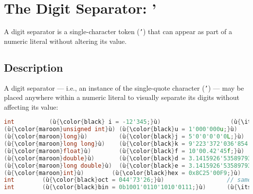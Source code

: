 \newpage
\section[Digit Separators]{The Digit Separator: {\SecCode '}}
\label{digitseparator} %
\label{digit-separators} %


A digit separator is a single-character token (\texttt{'}) that can appear as part of a
numeric literal without altering its value.

\subsection[Description]{Description}\label{description}

A digit separator --- i.e., an instance of the single-quote
character (\texttt{'}) --- may be placed anywhere within a numeric
literal to visually separate its digits without affecting its value:


\begin{lstlisting}[language=C++]
int          (ù{\color{black} i = -12'345;}ù)                    (ù{\itshape\color{skyblue}// same as}ù) (ù{\codeincomments{-12345}}ù)
(ù{\color{maroon}unsigned int}ù) (ù{\color{black}u = 1'000'000u;}ù)                 (ù{\itshape\color{skyblue}// same as}ù) (ù{\codeincomments{1000000u}}ù)
(ù{\color{maroon}long}ù)         (ù{\color{black}j = 5'0'0'0'0'0L;}ù)               // same as (ù{\codeincomments{500000L}}ù)
(ù{\color{maroon}long long}ù)    (ù{\color{black}k = 9'223'372'036'854'775'807;}ù)  // same as (ù{\codeincomments{9223372036854775807}}ù)
(ù{\color{maroon}float}ù)        (ù{\color{black}f = 10'00.42'45f;}ù)               // same as (ù{\codeincomments{1000.4245f}}ù)
(ù{\color{maroon}double}ù)       (ù{\color{black}d = 3.1415926'53589793;}ù)         (ù{\itshape\color{skyblue}// same as}ù) (ù{\codeincomments{3.141592653589793}}ù)
(ù{\color{maroon}long double}ù)  (ù{\color{black}e = 3.1415926'53589793'23846;}ù)   (ù{\itshape\color{skyblue}// same as}ù) (ù{\codeincomments{3.14159265358979323846}}ù)
(ù{\color{maroon}int}ù)        (ù{\color{black}hex = 0x8C25'00F9;}ù)                // same as (ù{\codeincomments{0x8C2500F9}}ù)
int        (ù{\color{black}oct = 044'73'26;}ù)                  // same as (ù{\codeincomments{0447326}}ù)
int        (ù{\color{black}bin = 0b1001'0110'1010'0111;}ù)      (ù{\itshape\color{skyblue}// same as}ù) (ù{\codeincomments{0b1001011000110001}}ù)
\end{lstlisting}

